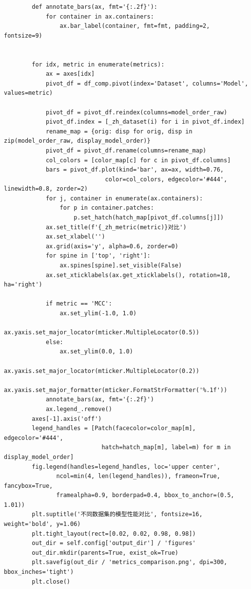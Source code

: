 \begin{lstlisting}
        def annotate_bars(ax, fmt='{:.2f}'):
            for container in ax.containers:
                ax.bar_label(container, fmt=fmt, padding=2, fontsize=9)


        for idx, metric in enumerate(metrics):
            ax = axes[idx]
            pivot_df = df_comp.pivot(index='Dataset', columns='Model', values=metric)

            pivot_df = pivot_df.reindex(columns=model_order_raw)
            pivot_df.index = [_zh_dataset(i) for i in pivot_df.index]
            rename_map = {orig: disp for orig, disp in zip(model_order_raw, display_model_order)}
            pivot_df = pivot_df.rename(columns=rename_map)
            col_colors = [color_map[c] for c in pivot_df.columns]
            bars = pivot_df.plot(kind='bar', ax=ax, width=0.76,
                             color=col_colors, edgecolor='#444', linewidth=0.8, zorder=2)
            for j, container in enumerate(ax.containers):
                for p in container.patches:
                    p.set_hatch(hatch_map[pivot_df.columns[j]])
            ax.set_title(f'{_zh_metric(metric)}对比')
            ax.set_xlabel('')
            ax.grid(axis='y', alpha=0.6, zorder=0)
            for spine in ['top', 'right']:
                ax.spines[spine].set_visible(False)
            ax.set_xticklabels(ax.get_xticklabels(), rotation=18, ha='right')

            if metric == 'MCC':
                ax.set_ylim(-1.0, 1.0)
                ax.yaxis.set_major_locator(mticker.MultipleLocator(0.5))
            else:
                ax.set_ylim(0.0, 1.0)
                ax.yaxis.set_major_locator(mticker.MultipleLocator(0.2))
            ax.yaxis.set_major_formatter(mticker.FormatStrFormatter('%.1f'))
            annotate_bars(ax, fmt='{:.2f}')
            ax.legend_.remove()
        axes[-1].axis('off')
        legend_handles = [Patch(facecolor=color_map[m], edgecolor='#444',
                            hatch=hatch_map[m], label=m) for m in display_model_order]
        fig.legend(handles=legend_handles, loc='upper center',
               ncol=min(4, len(legend_handles)), frameon=True, fancybox=True,
               framealpha=0.9, borderpad=0.4, bbox_to_anchor=(0.5, 1.01))
        plt.suptitle('不同数据集的模型性能对比', fontsize=16, weight='bold', y=1.06)
        plt.tight_layout(rect=[0.02, 0.02, 0.98, 0.98])
        out_dir = self.config['output_dir'] / 'figures'
        out_dir.mkdir(parents=True, exist_ok=True)
        plt.savefig(out_dir / 'metrics_comparison.png', dpi=300, bbox_inches='tight')
        plt.close()


\end{lstlisting}
